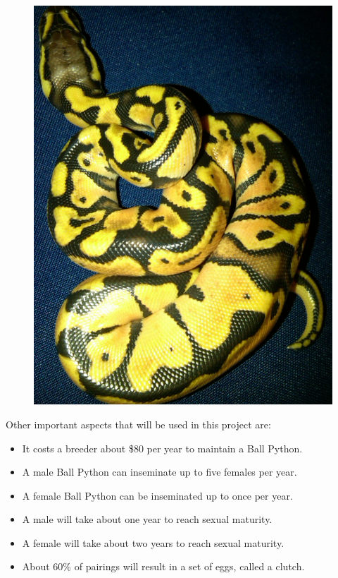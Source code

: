 \documentclass{paper}
\begin{document}
\begin{spacing}{1.5}
\begin{multicols}{2}
\begin{figure}[H]
	\end{figure}
	\begin{figure}[H]
	\centering
	\includegraphics[width=.5\textwidth]{Pastel.jpg}
	\end{figure}
	\end{multicols}
	
	
	Other important aspects that will be used in this project are:
	\begin{itemize}
	\item It costs a breeder about \$80 per year to maintain a Ball Python.
	\item A male Ball Python can inseminate up to five females per year.
	\item A female Ball Python can be inseminated up to once per year.
	\item A male will take about one year to reach sexual maturity.
	\item A female will take about two years to reach sexual maturity.
	\item About 60\% of pairings will result in a set of eggs, called a clutch.
	\end{itemize}

	\end{spacing}
	
	\nocite{*}
\end{document}
